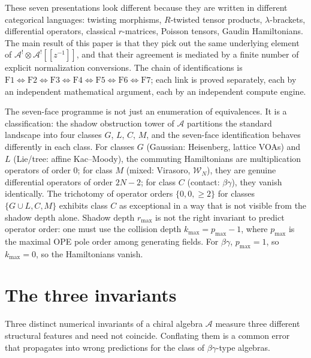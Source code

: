 \documentclass[11pt]{article}
\theoremstyle{plain}
\theoremstyle{definition}
\theoremstyle{remark}
\newcommand{\cA}{\mathcal{A}}
\newcommand{\Walg}{\mathcal{W}}
\begin{document}
These seven presentations look different because they are written
in different categorical languages: twisting morphisms, $R$-twisted
tensor products, $\lambda$-brackets, differential operators,
classical $r$-matrices, Poisson tensors, Gaudin Hamiltonians.
The main result of this paper is that they pick out the same
underlying element of $\cA^{!}\otimes\cA^{!}[\![z^{-1}]\!]$, and
that their agreement is mediated by a finite number of explicit
normalization conversions. The chain of identifications is
$\mathrm{F1}\Leftrightarrow\mathrm{F2}\Leftrightarrow\mathrm{F3}
\Leftrightarrow\mathrm{F4}\Leftrightarrow\mathrm{F5}
\Leftrightarrow\mathrm{F6}\Leftrightarrow\mathrm{F7}$; each link
is proved separately, each by an independent mathematical argument,
each by an independent compute engine.

The seven-face programme is not just an enumeration of
equivalences. It is a classification: the shadow obstruction tower of
$\cA$ partitions the standard landscape into four classes $G$, $L$,
$C$, $M$, and the seven-face identification behaves differently
in each class. For classes $G$ (Gaussian: Heisenberg, lattice VOAs)
and $L$ (Lie/tree: affine Kac--Moody), the commuting Hamiltonians are
multiplication operators of order $0$; for class $M$ (mixed:
Virasoro, $\Walg_N$), they are genuine differential operators of
order $2N-2$; for class $C$ (contact: $\beta\gamma$), they vanish
identically. The trichotomy of operator orders
$\{0, 0, \geq 2\}$ for classes $\{G\cup L, C, M\}$ exhibits
class $C$ as exceptional in a way that is not visible from the
shadow depth alone. Shadow depth $r_{\max}$ is not the right
invariant to predict operator order: one must use the collision
depth
$k_{\max} = p_{\max}-1$, where $p_{\max}$ is the maximal OPE pole
order among generating fields. For $\beta\gamma$,
$p_{\max}=1$, so $k_{\max}=0$, so the Hamiltonians vanish.


\section{The three invariants}\label{sec:three-invariants}

Three distinct numerical invariants of a chiral algebra $\cA$
measure three different structural features and need not coincide.
Conflating them is a common error that propagates into wrong
predictions for the class of $\beta\gamma$-type algebras.
\end{document}

